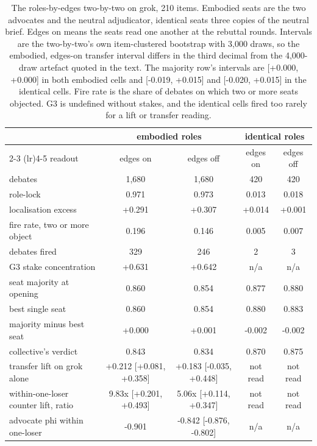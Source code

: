\begin{table}[t]
\centering
\caption{The roles-by-edges two-by-two on grok, 210 items. Embodied seats
are the two advocates and the neutral adjudicator, identical seats three
copies of the neutral brief. Edges on means the seats read one another at the
rebuttal rounds. Intervals are the two-by-two's own item-clustered bootstrap
with 3,000 draws, so the embodied, edges-on transfer interval differs in the
third decimal from the 4,000-draw artefact quoted in the text. The majority
row's intervals are [+0.000, +0.000] in both embodied cells and
[-0.019, +0.015] and [-0.020, +0.015] in the identical cells.
Fire rate is the share of debates on which two or more seats objected. G3 is
undefined without stakes, and the identical cells fired too rarely for a
lift or transfer reading.}
\label{tab-topology}
\footnotesize
\setlength{\tabcolsep}{2.5pt}
\begin{tabular}{lcccc}
\toprule
 & \multicolumn{2}{c}{embodied roles} & \multicolumn{2}{c}{identical roles} \\
\cmidrule(lr){2-3} \cmidrule(lr){4-5}
readout & edges on & edges off & edges on & edges off \\
\midrule
debates                        & 1,680 & 1,680 & 420 & 420 \\
role-lock                      & 0.971 & 0.973 & 0.013 & 0.018 \\
localisation excess            & +0.291 & +0.307 & +0.014 & +0.001 \\
fire rate, two or more object  & 0.196 & 0.146 & 0.005 & 0.007 \\
debates fired                  & 329 & 246 & 2 & 3 \\
G3 stake concentration         & +0.631 & +0.642 & n/a & n/a \\
seat majority at opening       & 0.860 & 0.854 & 0.877 & 0.880 \\
best single seat               & 0.860 & 0.854 & 0.880 & 0.883 \\
majority minus best seat       & +0.000 & +0.001 & -0.002 & -0.002 \\
collective's verdict           & 0.843 & 0.834 & 0.870 & 0.875 \\
transfer lift on grok alone    & +0.212 [+0.081, +0.358] & +0.183 [-0.035, +0.448] & not read & not read \\
within-one-loser counter lift, ratio & 9.83x [+0.201, +0.493] & 5.06x [+0.114, +0.347] & not read & not read \\
advocate phi within one-loser  & -0.901 & -0.842 [-0.876, -0.802] & n/a & n/a \\
\bottomrule
\end{tabular}
\end{table}

